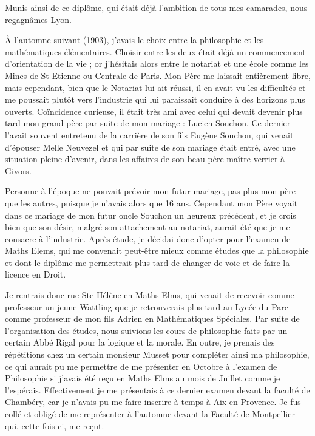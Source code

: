 \documentclass[11pt,a4paper]{report}
\begin{document}
Munis ainsi de ce diplôme, qui était déjà l'ambition de tous mes camarades, nous regagnâmes Lyon.

À l'automne suivant (1903), j'avais le choix entre la philosophie et les mathématiques élémentaires. Choisir entre les deux était déjà un commencement d'orientation de la vie ; or j'hésitais alors entre le notariat et une école comme les Mines de St Etienne ou Centrale de Paris. Mon Père me laissait entièrement libre, mais cependant, bien que le Notariat lui ait réussi, il en avait vu les difficultés et me poussait plutôt vers l'industrie qui lui paraissait conduire à des horizons plus ouverts. Coïncidence curieuse, il était très ami avec celui qui devait devenir plus tard mon grand-père par suite de mon mariage : Lucien Souchon. Ce dernier l'avait souvent entretenu de la carrière de son fils Eugène Souchon, qui venait d'épouser Melle Neuvezel et qui par suite de son mariage était entré, avec une situation pleine d'avenir, dans les affaires de son beau-père maître verrier à Givors.

Personne à l'époque ne pouvait prévoir mon futur mariage, pas plus mon père que les autres, puisque je n'avais alors que 16 ans. Cependant mon Père voyait dans ce mariage de mon futur oncle Souchon un heureux précédent, et je crois bien que son désir, malgré son attachement au notariat, aurait été que je me consacre à l'industrie. Après étude, je décidai donc d'opter pour l'examen de Maths Elems, qui me convenait peut-être mieux comme études que la philosophie et dont le diplôme me permettrait plus tard de changer de voie et de faire la licence en Droit.

Je rentrais donc rue Ste Hélène en Maths Elms, qui venait de recevoir comme professeur un jeune Wattling que je retrouverais plus tard au Lycée du Parc comme professeur de mon fils Adrien en Mathématiques Spéciales. Par suite de l'organisation des études, nous suivions les cours de philosophie faits par un certain Abbé Rigal pour la logique et la morale. En outre, je prenais des répétitions chez un certain monsieur Musset pour compléter ainsi ma philosophie, ce qui aurait pu me permettre de me présenter en Octobre à l'examen de Philosophie si j'avais été reçu en Maths Elms au mois de Juillet comme je l'espérais. Effectivement je me présentais à ce dernier examen devant la faculté de Chambéry, car je n'avais pu me faire inscrire à temps à Aix en Provence. Je fus collé et obligé de me représenter à l'automne devant la Faculté de Montpellier qui, cette fois-ci, me reçut.
\end{document}
